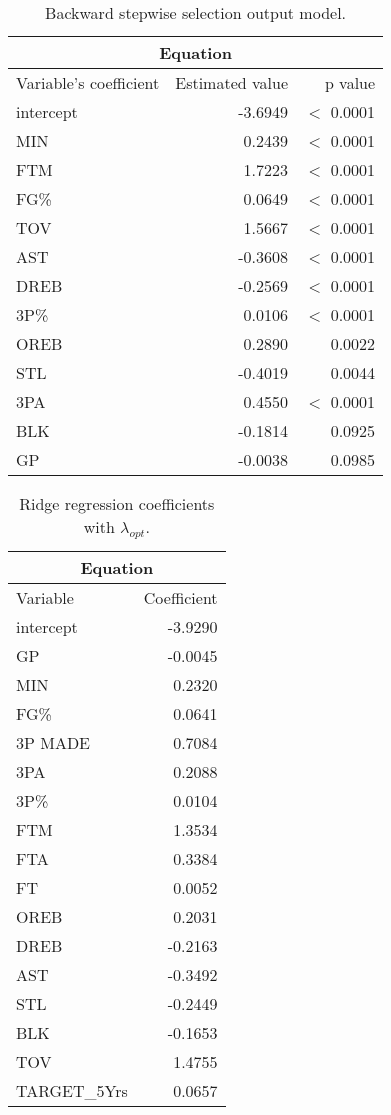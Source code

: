 \begin{table}[H]
	\centering
	\begin{tabular}{|| l | r | r ||} 
		\hline
		\multicolumn{3}{|c|}{Equation} \\
		\hline
		Variable's coefficient & Estimated value & p value \\
		\hline
		intercept & -3.6949 & $<$ 0.0001 \\
		MIN & 0.2439 & $<$ 0.0001 \\
		FTM & 1.7223 & $<$ 0.0001 \\
		FG\% & 0.0649 & $<$ 0.0001 \\
		TOV & 1.5667 & $<$ 0.0001 \\
		AST & -0.3608 & $<$ 0.0001 \\
		DREB & -0.2569 & $<$ 0.0001 \\
		3P\% & 0.0106 & $<$ 0.0001 \\
		OREB & 0.2890 & 0.0022 \\
		STL & -0.4019 & 0.0044 \\
		3PA & 0.4550 & $<$ 0.0001 \\
		BLK & -0.1814 & 0.0925 \\
		GP & -0.0038 & 0.0985 \\
		\hline
	\end{tabular}
	\caption{Backward stepwise selection output model.}
	\label{table:BackwardModelSummary}
\end{table}

\begin{table}[H]
	\centering
	\begin{tabular}{|| l | r ||} 
		\hline
		\multicolumn{2}{|c|}{Equation} \\
		\hline
		Variable & Coefficient \\
		\hline
		intercept & -3.9290 \\
		GP & -0.0045 \\
		MIN & 0.2320 \\
		FG\% & 0.0641 \\
		3P MADE & 0.7084 \\
		3PA & 0.2088 \\
		3P\% & 0.0104 \\
		FTM & 1.3534 \\
		FTA & 0.3384 \\
		FT & 0.0052 \\
		OREB & 0.2031 \\
		DREB & -0.2163 \\
		AST & -0.3492 \\			
		STL & -0.2449 \\
		BLK & -0.1653 \\
		TOV & 1.4755 \\
		TARGET\_5Yrs & 0.0657 \\				
		\hline
	\end{tabular}
	\caption{Ridge regression coefficients with $\lambda_{opt}$.}
	\label{table:FinalRidgeCoef}
\end{table}

